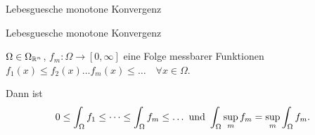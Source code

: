 \documentclass[class=article, crop=false]{standalone}
\begin{document}
\begin{zettel}{Lebesguesche monotone Konvergenz}
\begin{flashcard}[0kzt6a2a]{Lebesguesche monotone Konvergenz}
	\begin{theorem}
		$\Omega \in  \Omega_{\mathbb{R}^n}$, $f_m : \Omega \to  [0,\infty]$ eine Folge messbarer Funktionen $f_1(x)\leq f_2(x) \dots f_m(x) \leq  \dots \quad \forall x \in \Omega$.

		Dann ist
		\[
			0 \leq \int_{\Omega}f_1 \leq \dots \leq \int_{\Omega} f_m \leq \dots \text{ und }  \int_{\Omega} \sup_m f_m = \sup_m \int_{\Omega } f_m
		.\]
	\end{theorem}
\end{flashcard}
\end{zettel}
\end{document}
